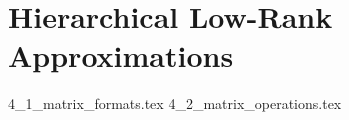 \chapter{Hierarchical Low-Rank Approximations}
\label{chap:hierarchical_matrices}

{4_1_matrix_formats.tex}
{4_2_matrix_operations.tex}